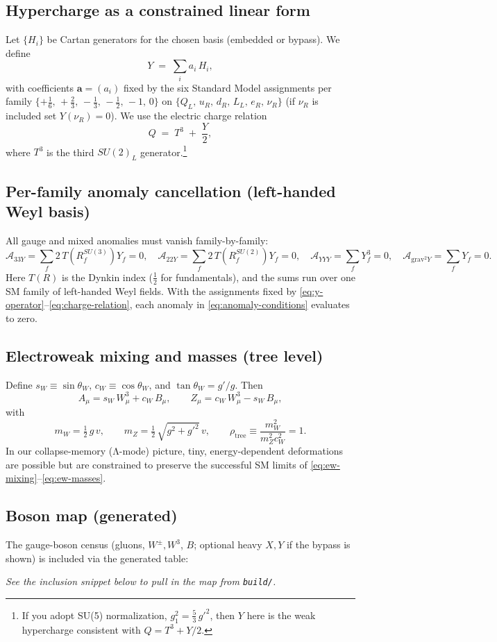 \subsection*{Hypercharge as a constrained linear form}
Let $\{H_i\}$ be Cartan generators for the chosen basis (embedded or bypass).
We define
\begin{equation}
  \label{eq:y-operator}
  Y \;=\; \sum_i a_i\,H_i,
\end{equation}
with coefficients $\mathbf a=(a_i)$ fixed by the six Standard Model assignments per family
$\{+\tfrac16,\,+\tfrac23,\,-\tfrac13,\,-\tfrac12,\,-1,\,0\}$ on
$\{Q_L,\,u_R,\,d_R,\,L_L,\,e_R,\,\nu_R\}$ (if $\nu_R$ is included set $Y(\nu_R)=0$).
We use the electric charge relation
\begin{equation}
  \label{eq:charge-relation}
  Q \;=\; T^3 \;+\; \frac{Y}{2},
\end{equation}
where $T^3$ is the third $SU(2)_L$ generator.\footnote{If you adopt SU(5) normalization,
$g_1^2 = \tfrac{5}{3}\,g'^2$, then $Y$ here is the weak hypercharge consistent with $Q=T^3+Y/2$.}

\subsection*{Per-family anomaly cancellation (left-handed Weyl basis)}
All gauge and mixed anomalies must vanish family-by-family:
\begin{equation}
  \label{eq:anomaly-conditions}
  \mathcal A_{33Y}=\sum_f 2\,T\!\left(R_f^{SU(3)}\right) Y_f=0,\quad
  \mathcal A_{22Y}=\sum_f 2\,T\!\left(R_f^{SU(2)}\right) Y_f=0,\quad
  \mathcal A_{YYY}=\sum_f Y_f^3=0,\quad
  \mathcal A_{\mathrm{grav}^2 Y}=\sum_f Y_f=0.
\end{equation}
Here $T(R)$ is the Dynkin index ($\tfrac12$ for fundamentals), and the sums run over one SM family of
left-handed Weyl fields. With the assignments fixed by \eqref{eq:y-operator}–\eqref{eq:charge-relation},
each anomaly in \eqref{eq:anomaly-conditions} evaluates to zero.

\subsection*{Electroweak mixing and masses (tree level)}
Define $s_W\equiv \sin\theta_W$, $c_W\equiv \cos\theta_W$, and $\tan\theta_W = g'/g$. Then
\begin{equation}
  \label{eq:ew-mixing}
  A_\mu = s_W\, W^3_\mu + c_W\, B_\mu,\qquad
  Z_\mu = c_W\, W^3_\mu - s_W\, B_\mu,
\end{equation}
with
\begin{equation}
  \label{eq:ew-masses}
  m_W=\tfrac12\,g\,v,\qquad
  m_Z=\tfrac12\,\sqrt{g^2+g'^2}\,v,\qquad
  \rho_{\text{tree}}\equiv \frac{m_W^2}{m_Z^2 c_W^2}=1.
\end{equation}
In our collapse-memory (Λ-mode) picture, tiny, energy-dependent deformations are possible but
are constrained to preserve the successful SM limits of \eqref{eq:ew-mixing}–\eqref{eq:ew-masses}.

\subsection*{Boson map (generated)}
The gauge-boson census (gluons, $W^\pm,W^3$, $B$; optional heavy $X,Y$ if the bypass is shown)
is included via the generated table:
\begin{center}
\textit{See the inclusion snippet below to pull in the map from \texttt{build/}.}
\end{center}
